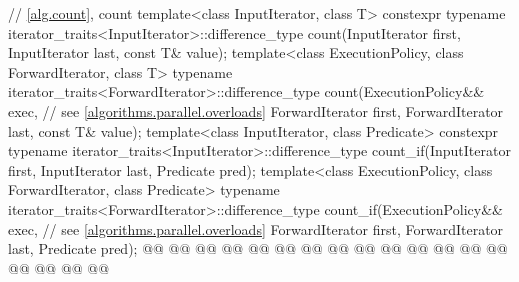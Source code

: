 \begin{codeblock}
{  // \ref{alg.count}, count
  template<class InputIterator, class T>
    constexpr typename iterator_traits<InputIterator>::difference_type
      count(InputIterator first, InputIterator last, const T& value);
  template<class ExecutionPolicy, class ForwardIterator, class T>
    typename iterator_traits<ForwardIterator>::difference_type
      count(ExecutionPolicy&& exec, // see \ref{algorithms.parallel.overloads}
            ForwardIterator first, ForwardIterator last, const T& value);
  template<class InputIterator, class Predicate>
    constexpr typename iterator_traits<InputIterator>::difference_type
      count_if(InputIterator first, InputIterator last, Predicate pred);
  template<class ExecutionPolicy, class ForwardIterator, class Predicate>
    typename iterator_traits<ForwardIterator>::difference_type
      count_if(ExecutionPolicy&& exec, // see \ref{algorithms.parallel.overloads}
               ForwardIterator first, ForwardIterator last, Predicate pred);
  @@
    @@
      @@
      @@
        @@
    @@
      @@
      @@
        @@
    @@
        @@
      @@
        @@
    @@
        @@
      @@
        @@
  @\added{\}}@

}
\end{codeblock}
